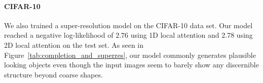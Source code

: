 \paragraph{CIFAR-10} We also trained a super-resolution model on the CIFAR-10 data set. Our model reached a negative log-likelihood of $2.76$ using 1D local attention and $2.78$ using 2D local attention on the test set. As seen in Figure~\ref{tab:completion_and_superres}, our model commonly generates plausible looking objects even though the input images seem to barely show any discernible structure beyond coarse shapes.
